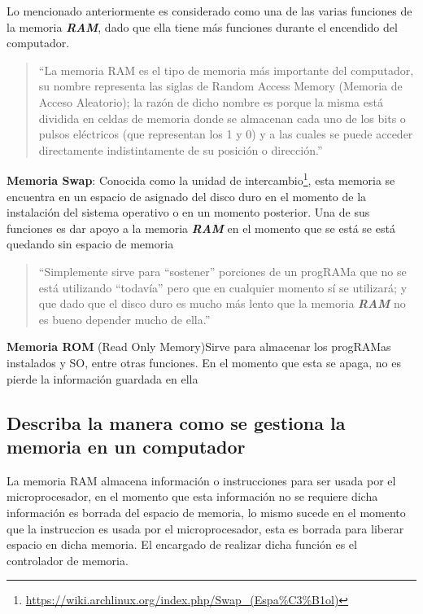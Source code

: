 \documentclass[12pt,letterpaper]{article}
\begin{document}
Lo mencionado anteriormente es considerado como una de las varias funciones de la memoria \textbf{\textit{RAM}}, dado que ella tiene más funciones durante el encendido del computador.

\begin{quote}
    ``La memoria RAM es el tipo de memoria más importante del computador, su nombre representa las siglas de Random Access Memory (Memoria de Acceso Aleatorio); la razón de dicho nombre es porque la misma está dividida en celdas de memoria donde se almacenan cada uno de los bits o pulsos eléctricos (que representan los 1 y 0) y a las cuales se puede acceder directamente indistintamente de su posición o dirección.''\cite{GuiaProfesor}
\end{quote}

\textbf{Memoria Swap}: Conocida como la unidad de intercambio\footnote{\url{https://wiki.archlinux.org/index.php/Swap_(Espa\%C3\%B1ol)}}, esta memoria se encuentra en un espacio de asignado del disco duro en el momento de la instalación del sistema operativo o en un momento posterior. Una de sus funciones es dar apoyo a la memoria \textbf{\textit{RAM}} en el momento que se está se está quedando sin espacio de memoria

\begin{quote}
    ``Simplemente sirve para ``sostener'' porciones de un progRAMa que no se está utilizando ``todavía'' pero que en cualquier momento sí se utilizará; y que dado que el disco duro es mucho más lento que la memoria \textbf{\textit{RAM}} no es bueno depender mucho de ella.''\cite{GuiaProfesor}
\end{quote}


\textbf{Memoria ROM} (Read Only Memory)Sirve para almacenar los progRAMas instalados y SO, entre otras funciones. En el momento que esta se apaga, no es pierde la información guardada en ella

        
\subsection{Describa la manera como se gestiona la memoria en un computador}
    La memoria RAM almacena información o instrucciones para ser usada por el microprocesador, en el momento que esta información no se requiere dicha información es borrada del espacio de memoria, lo mismo sucede en el momento que la instruccion es usada por el microprocesador, esta es borrada para liberar espacio en dicha memoria. El encargado de realizar dicha función es el controlador de memoria.       
\end{document}
